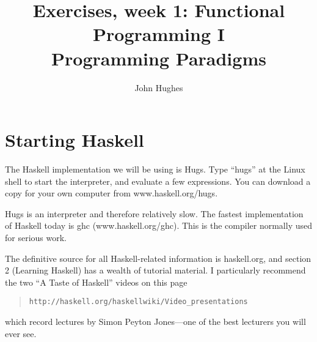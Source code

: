 \documentclass{article}
\begin{document}
\title{Exercises, week 1: Functional Programming I\\
  \large Programming Paradigms}
\author{John Hughes}
\maketitle

\newcommand{\answer}[1]{\begin{quote}{\bf Answer:} #1\end{quote}}
\newcommand{\percent}[1]{\marginpar[l]{\bf [#1 points]}}

\section{Starting Haskell\protect\percent{0}}
The Haskell implementation we will be using is Hugs. Type ``hugs''
at the Linux shell to start the interpreter, and evaluate a few
expressions. You can download a copy for your own computer from
www.haskell.org/hugs.

Hugs is an interpreter and therefore relatively slow. The fastest
implementation of Haskell today is ghc (www.haskell.org/ghc). This is
the compiler normally used for serious work. 

The definitive source for all Haskell-related information is
haskell.org, and section 2 (Learning Haskell) has a wealth of tutorial
material. I particularly recommend the two ``A Taste of Haskell''
videos on this page
\begin{quote}
\verb!http://haskell.org/haskellwiki/Video_presentations!
\end{quote}
which record
lectures by Simon Peyton Jones---one of the best lecturers you will
ever see.
\end{document}
